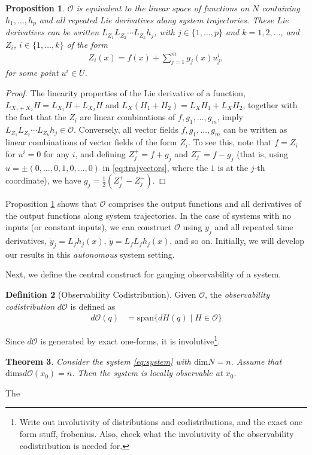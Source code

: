 \documentclass[psamsfonts]{amsart}
\newtheorem{thm}{Theorem}[section]
\newtheorem{prop}[thm]{Proposition}
\theoremstyle{definition}
\newtheorem{defn}[thm]{Definition}
\theoremstyle{remark}
\numberwithin{equation}{section}
\begin{document}
\begin{prop}\label{prop:O-space-equiv}
$\mathscr{O}$ is equivalent to the linear space of functions on $N$ containing $h_1, \dots, h_p$ and all repeated Lie derivatives along system trajectories. These Lie derivatives can be written $L_{Z_1}L_{Z_2}\cdots L_{Z_k}h_j$, with $j \in \{1, \dots, p\}$ and $k=1, 2, \dots$, and $Z_i$, $i\in \{1, \dots, k\}$ of the form
\begin{align}\label{eq:trajvectors}
Z_i(x) = f(x) + \sum_{j = 1}^{m}g_j(x)u_j^i,
\end{align} 
for some point $u^i \in U$. 
\end{prop}
\begin{proof}
The linearity properties of the Lie derivative of a function, $L_{X_1+X_2}H = L_{X_1}H+L_{X_2}H$ and $L_X(H_1+H_2) = L_XH_1 + L_XH_2$, together with the fact that the $Z_i$ are linear combinations of $f, g_1, \dots, g_m$, imply $L_{Z_1}L_{Z_2}\cdots L_{Z_k}h_j \in \mathscr{O}$. Conversely, all vector fields $f, g_1, \dots, g_m$ can be written as linear combinations of vector fields of the form $Z_i$. To see this, note that $f = Z_i$ for $u^i = 0$ for any $i$, and defining $Z_{j}^{+} = f+g_j$ and $Z_{j}^{-} = f-g_j$ (that is, using $u = \pm (0, \dots, 0, 1, 0, \dots, 0)$ in \eqref{eq:trajvectors}, where the $1$ is at the $j$-th coordinate), we have $g_j = \frac{1}{2}(Z_{j}^{+}-Z_{j}^{-})$.  
\end{proof}

Proposition \ref{prop:O-space-equiv} shows that $\mathscr{O}$ comprises the output functions and all derivatives of the output functions along system trajectories. In the case of systems with no inputs (or constant inputs), we can construct $\mathscr{O}$ using $y_j$ and all repeated time derivatives, $\dot y_j = L_fh_j(x)$, $\ddot y = L_fL_fh_j(x)$, and so on. Initially, we will develop our results in this \textit{autonomous} system setting. 

Next, we define the central construct for gauging observability of a system. 
\begin{defn}[Observability Codistribution]
Given $\mathscr{O}$, the \textit{observability codistribution} $d\mathscr{O}$ is defined as
\begin{align}
d\mathscr{O}(q) & = {} \text{span}\{d H(q) \mid H \in \mathscr{O}\}
\end{align}
\end{defn}
Since $d\mathscr{O}$ is generated by exact one-forms, {\color{red}it is involutive}\footnote{{\color{red}Write out involutivity of distributions and codistributions, and the exact one form stuff, frobenius. Also, check what the involutivity of the observability codistribution is needed for.}}. 

\begin{thm}
Consider the system \ref{eq:system} with $\text{dim}N = n$. Assume that $\text{dims}d\mathscr{O}(x_0) = n$. Then the system is locally observable at $x_0$.  
\end{thm}
The 



\end{document}
